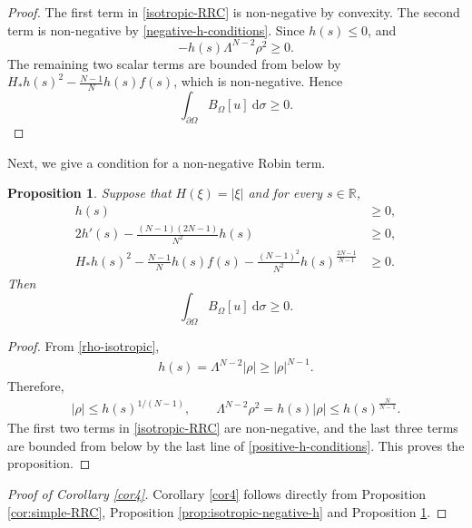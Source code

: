 \documentclass[10pt,a4paper]{amsart}
\numberwithin{equation}{section}
\newtheorem{prop}[thm]{Proposition}
\newcommand{\pa}{\partial}
\newcommand{\R}{\mathbb{R}}
\begin{document}
\begin{proof}
The first term in \eqref{isotropic-RRC} is non-negative by convexity.  The second term is non-negative by \eqref{negative-h-conditions}.  Since $h(s)\le0$, and
$$ -h(s)\Lambda^{N-2}\rho^2\ge0.$$ The remaining two scalar terms are bounded from below by $H_*h(s)^2- \frac{N-1}{N}h(s)f(s)$, which is non-negative.  Hence $$\int_{\pa \Omega} B_{\Omega}[u]\ \text{d} \sigma  \geq 0.$$
\end{proof}

Next, we give a condition for a non-negative Robin term.
\begin{prop}\label{prop:isotropic-positive-h}
Suppose that $H(\xi)=|\xi|$ and for every $s\in \R$,
\begin{align}\label{positive-h-conditions}
       h(s)&\ge0,\nonumber\\
       2h'(s)- \frac{(N-1)(2N-1)}{N^2} h(s)&\ge0,\\
       H_*h(s)^2- \frac{N-1}{N} h(s)f(s)-\frac{(N-1)^2}{N^2}h(s)^{\frac{2N-1}{N-1}}&\ge0.\nonumber
\end{align}
Then $$\int_{\pa \Omega} B_{\Omega}[u]  \ \text{d} \sigma \geq 0.$$
\end{prop}

\begin{proof}
From \eqref{rho-isotropic},
\begin{align*}
       h(s)=\Lambda^{N-2}|\rho|\ge|\rho|^{N-1}.
\end{align*}
Therefore,
\begin{align*}
       |\rho|\le h(s)^{1/(N-1)},
       \qquad \Lambda^{N-2}\rho^2=h(s)|\rho|\le h(s)^{\frac{N}{N-1}}.
\end{align*}
The first two terms in \eqref{isotropic-RRC} are non-negative, and the last three terms are bounded from below by the last line of \eqref{positive-h-conditions}.  This proves the proposition.
\end{proof}



\begin{proof}[Proof of Corollary \ref{cor4}]
Corollary \ref{cor4} follows directly from Proposition \ref{cor:simple-RRC}, Proposition \ref{prop:isotropic-negative-h} and Proposition \ref{prop:isotropic-positive-h}.
\end{proof}
\end{document}
